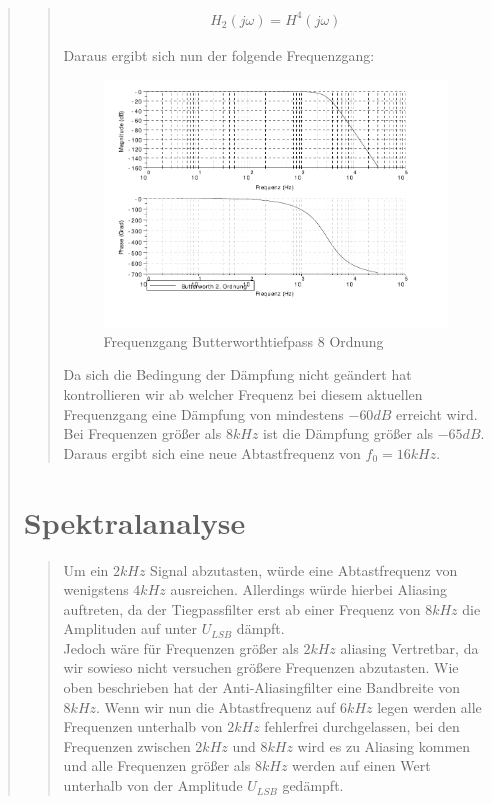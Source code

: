 \begin{quote}
\begin{quote}
        \begin{equation*}
        	\begin{split}
        		H_2(j\omega) = H^4 (j\omega)
        	\end{split}
        \end{equation*}
        
        Daraus ergibt sich nun der folgende Frequenzgang:
        
        \begin{figure}[H]
			\centering
				\includegraphics[scale=1]{Frequenzgang8Ordnung}
				   \caption{Frequenzgang Butterworthtiefpass 8 Ordnung}
		\end{figure}
		\vspace{1em}
	 	
	 	Da sich die Bedingung der Dämpfung nicht geändert hat kontrollieren wir ab welcher Frequenz bei diesem aktuellen
	 	Frequenzgang eine Dämpfung von mindestens $-60 dB$ erreicht wird.\\
	 	Bei Frequenzen größer als $8kHz$ ist die Dämpfung größer als $-65 dB$. Daraus ergibt sich eine neue Abtastfrequenz
	 	von $f_0 = 16kHz$.
    \end{quote}
    
    \section{Spektralanalyse}
    \begin{quote}
    	Um ein $2kHz$ Signal abzutasten, würde eine Abtastfrequenz von wenigstens $4 kHz$ ausreichen. Allerdings würde
    	hierbei Aliasing auftreten, da der Tiegpassfilter erst ab einer Frequenz von $8 kHz$ die Amplituden auf unter
    	$U_{LSB}$ dämpft.\\
    	Jedoch wäre für Frequenzen größer als $2kHz$ aliasing Vertretbar, da wir sowieso nicht versuchen größere Frequenzen
    	abzutasten. Wie oben beschrieben hat der Anti-Aliasingfilter eine Bandbreite von $8kHz$. Wenn wir nun die
    	Abtastfrequenz auf $6kHz$ legen werden alle Frequenzen unterhalb von $2kHz$ fehlerfrei durchgelassen, bei den
    	Frequenzen zwischen $2kHz$ und $8kHz$ wird es zu Aliasing kommen und alle Frequenzen größer als $8kHz$ werden auf
    	einen Wert unterhalb von der Amplitude $U_{LSB}$ gedämpft.\\


\end{quote}
\end{quote}
